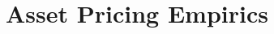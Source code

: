 




\def\bbR{{I\kern-0.3em R}}

\def\Az{{A_z}}
\def\Cz{{C_z}}
\def\ez{{e_z}}

\def\epigraph#1#2{%
\begingroup
\smallskip
\leftskip=2em
\rightskip=0pt plus2em
\it\noindent #1\par
\noindent --- #2\par
\endgroup\noindent}

\def\tone{{t+1}}
\def\toner{{t-1}}
\def\pdp{{{p_{t+1}+d_{t+1}\over p_t}}}
\def\ucuc{{{u'(c_{t+1})\over u'(c_t)}}}
\def\ucucc{{{u'(c_{t+2})\over u'(c_t)}}}
\def\cov{{\rm cov}}
\chapter{Asset Pricing Empirics\label{assetpricing2}}
